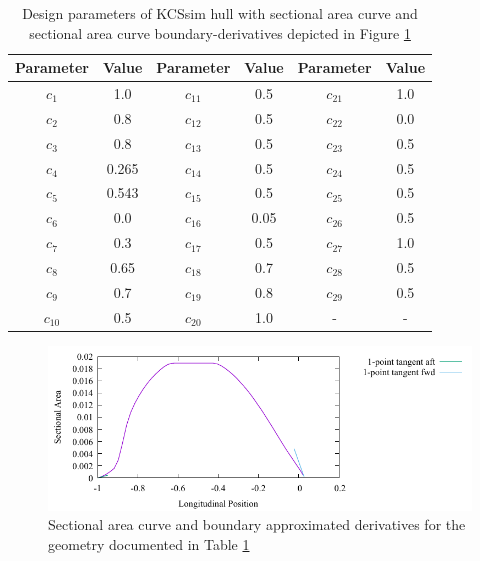 \documentclass{report}
\begin{document}
\begin{table}[H]
    \centering
    \begin{tabular}{|c|c|c|c|c|c|}
        \hline 
        Parameter & Value & Parameter & Value & Parameter & Value\\
        \hline 
        $c_1$ & 1.0 & $c_{11}$ & 0.5 & $c_{21}$ & 1.0 \\
        \hline 
        $c_2$ & 0.8 & $c_{12}$ & 0.5 & $c_{22}$ & 0.0\\
        \hline 
        $c_3$ & 0.8 & $c_{13}$ & 0.5 & $c_{23}$ & 0.5 \\
        \hline 
        $c_4$ & 0.265 & $c_{14}$ & 0.5 & $c_{24}$ & 0.5 \\
        \hline 
        $c_5$ & 0.543 & $c_{15}$ & 0.5 & $c_{25}$ & 0.5 \\
        \hline 
        $c_6$ & 0.0 & $c_{16}$ & 0.05 & $c_{26}$ & 0.5 \\
        \hline 
        $c_7$ & 0.3 & $c_{17}$ & 0.5 & $c_{27}$ & {\color{blue} 1.0} \\
        \hline 
        $c_8$ & 0.65 & $c_{18}$ & 0.7 & $c_{28}$ & 0.5 \\
        \hline 
        $c_9$ & 0.7 & $c_{19}$ & 0.8 & $c_{29}$ & 0.5 \\
        \hline 
        $c_{10}$ & 0.5 & $c_{20}$ & 1.0 & - & - \\
        \hline 
    \end{tabular}
    \caption{Design parameters of KCSsim hull with sectional area curve and 
    sectional area curve boundary-derivatives depicted in Figure
    \ref{fig:test-4-sac-9}}
    \label{tab:test-4-9}
\end{table}
\begin{figure}[H]
    \centering
    \includegraphics[width = 0.7\linewidth]{figures/test-4-sac-9.pdf}
    \caption{Sectional area curve and boundary approximated derivatives for
    the geometry documented in Table \ref{tab:test-4-9}}
    \label{fig:test-4-sac-9}
\end{figure}
\end{document}

